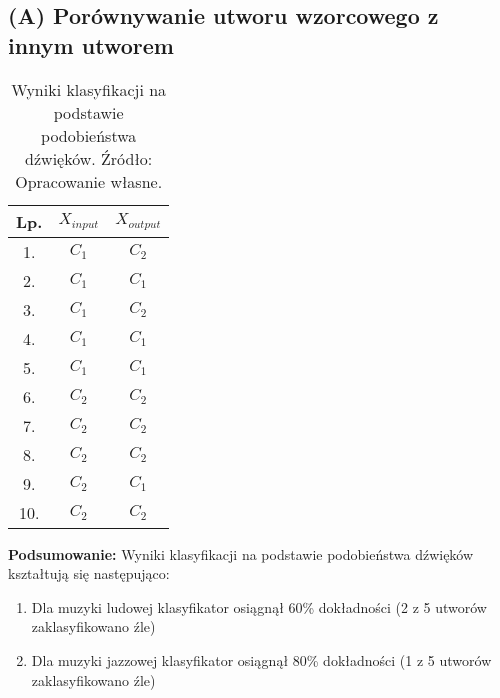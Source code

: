\subsection{(A) Porównywanie utworu wzorcowego z innym utworem}
\FloatBarrier
\begin{table}[h]
\centering
\begin{tabular}{|c|c|c|}
\hline
Lp. & $X_{input}$ & $X_{output}$ \\ \hline
1.   & $C_{1}$      & $C_{2}$      \\ \hline
2.   & $C_{1}$      & $C_{1}$     \\ \hline
3.   & $C_{1}$      & $C_{2}$      \\ \hline
4.   & $C_{1}$      & $C_{1}$     \\ \hline
5.   & $C_{1}$      & $C_{1}$      \\ \hline
6.   & $C_{2}$      & $C_{2}$    \\ \hline
7.   & $C_{2}$      & $C_{2}$     \\ \hline
8.   & $C_{2}$      & $C_{2}$     \\ \hline
9.   & $C_{2}$      & $C_{1}$     \\ \hline
10.  & $C_{2}$      & $C_{2}$      \\ \hline
\end{tabular}
\caption{Wyniki klasyfikacji na podstawie podobieństwa dźwięków. Źródło: Opracowanie własne.}
\end{table}
\FloatBarrier

\textbf{Podsumowanie:}
Wyniki klasyfikacji na podstawie podobieństwa dźwięków kształtują się następująco:

\begin{enumerate}
    \item Dla muzyki ludowej klasyfikator osiągnął 60\% dokładności (2 z 5 utworów zaklasyfikowano źle)
    \item Dla muzyki jazzowej klasyfikator osiągnął 80\% dokładności (1 z 5 utworów zaklasyfikowano źle)
\end{enumerate}

